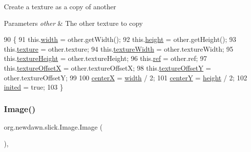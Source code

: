 Create a texture as a copy of another


\begin{DoxyParams}{Parameters}
{\em other} & The other texture to copy \\
\hline
\end{DoxyParams}

\begin{DoxyCode}
90                                  \{
91         this.\mbox{\hyperlink{classorg_1_1newdawn_1_1slick_1_1_image_a7d02c85e21b388428cfe5cc5c82714a1}{width}} = other.getWidth();
92         this.\mbox{\hyperlink{classorg_1_1newdawn_1_1slick_1_1_image_a54397a37823bc59ddc79ec70dc5cf226}{height}} = other.getHeight();
93         this.\mbox{\hyperlink{classorg_1_1newdawn_1_1slick_1_1_image_a9fd9ddb21247305c83ac4e37d9d51f79}{texture}} = other.texture;
94         this.\mbox{\hyperlink{classorg_1_1newdawn_1_1slick_1_1_image_a0beda6fc601023aff97cce0d20d81f1e}{textureWidth}} = other.textureWidth;
95         this.\mbox{\hyperlink{classorg_1_1newdawn_1_1slick_1_1_image_a048cc714a1282eac215dbe4e722a3146}{textureHeight}} = other.textureHeight;
96         this.\mbox{\hyperlink{classorg_1_1newdawn_1_1slick_1_1_image_a32694687591a80299d8b8ad1ea070cee}{ref}} = other.ref;
97         this.\mbox{\hyperlink{classorg_1_1newdawn_1_1slick_1_1_image_a0d11936067f8ad706c42a5feb411b5c8}{textureOffsetX}} = other.textureOffsetX;
98         this.\mbox{\hyperlink{classorg_1_1newdawn_1_1slick_1_1_image_a5c542a6d5fccbb7d56d74129b05cb78d}{textureOffsetY}} = other.textureOffsetY;
99     
100         \mbox{\hyperlink{classorg_1_1newdawn_1_1slick_1_1_image_aef548becf8450e7173bbd8bded5b6b48}{centerX}} = \mbox{\hyperlink{classorg_1_1newdawn_1_1slick_1_1_image_a7d02c85e21b388428cfe5cc5c82714a1}{width}} / 2;
101         \mbox{\hyperlink{classorg_1_1newdawn_1_1slick_1_1_image_a3935c6eead627c8aa8667985fc314496}{centerY}} = \mbox{\hyperlink{classorg_1_1newdawn_1_1slick_1_1_image_a54397a37823bc59ddc79ec70dc5cf226}{height}} / 2;
102         \mbox{\hyperlink{classorg_1_1newdawn_1_1slick_1_1_image_aa694324d7d8b46bbe65e066ca29cecfb}{inited}} = \textcolor{keyword}{true};
103     \}
\end{DoxyCode}
\mbox{\label{classorg_1_1newdawn_1_1slick_1_1_image_a2c047fa669a8387f6c2d9bde33b3ee04}} 
\subsubsection{\texorpdfstring{Image()}{Image()}\hspace{0.1cm}{\footnotesize\ttfamily [2/16]}}
{\footnotesize\ttfamily org.\+newdawn.\+slick.\+Image.\+Image (\begin{DoxyParamCaption}{ }\end{DoxyParamCaption})\hspace{0.3cm}{\ttfamily [inline]}, {\ttfamily [protected]}}

